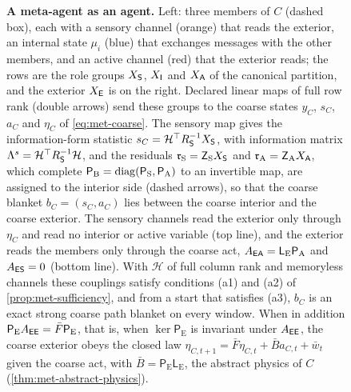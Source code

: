 \begin{figure}[t]
  \centering
  
  \caption{\textbf{A meta-agent as an agent.} Left: three members of $C$ (dashed box), each with a sensory channel (orange) that reads the exterior, an internal state $\mu_i$ (blue) that exchanges messages with the other members, and an active channel (red) that the exterior reads; the rows are the role groups $X_{\mathsf{S}}$, $X_{\mathsf{I}}$ and $X_{\mathsf{A}}$ of the canonical partition, and the exterior $X_{\mathsf{E}}$ is on the right. Declared linear maps of full row rank (double arrows) send these groups to the coarse states $y_C$, $s_C$, $a_C$ and $\eta_C$ of \eqref{eq:met-coarse}. The sensory map gives the information-form statistic $s_C=\mathcal H^\top R_{\mathsf{S}}^{-1}X_{\mathsf{S}}$, with information matrix $\Lambda^s=\mathcal H^\top R_{\mathsf{S}}^{-1}\mathcal H$, and the residuals $\mathfrak r_{\mathrm S}=\mathsf Z_{\mathrm S}X_{\mathsf{S}}$ and $\mathfrak r_{\mathrm A}=\mathsf Z_{\mathrm A}X_{\mathsf{A}}$, which complete $\mathsf P_{\mathrm B}=\operatorname{diag}(\mathsf P_{\mathrm S},\mathsf P_{\mathrm A})$ to an invertible map, are assigned to the interior side (dashed arrows), so that the coarse blanket $b_C=(s_C,a_C)$ lies between the coarse interior and the coarse exterior. The sensory channels read the exterior only through $\eta_C$ and read no interior or active variable (top line), and the exterior reads the members only through the coarse act, $A_{\mathsf{E}\mathsf{A}}=\mathsf L_{\mathrm E}\mathsf P_{\mathrm A}$ and $A_{\mathsf{E}\mathsf{S}}=0$ (bottom line). With $\mathcal H$ of full column rank and memoryless channels these couplings satisfy conditions (a1) and (a2) of \cref{prop:met-sufficiency}, and from a start that satisfies (a3), $b_C$ is an exact strong coarse path blanket on every window. When in addition $\mathsf P_{\mathrm E}A_{\mathsf{E}\mathsf{E}}=\bar F\mathsf P_{\mathrm E}$, that is, when $\ker\mathsf P_{\mathrm E}$ is invariant under $A_{\mathsf{E}\mathsf{E}}$, the coarse exterior obeys the closed law $\eta_{C,t+1}=\bar F\eta_{C,t}+\bar Ba_{C,t}+\bar w_t$ given the coarse act, with $\bar B=\mathsf P_{\mathrm E}\mathsf L_{\mathrm E}$, the abstract physics of $C$ (\cref{thm:met-abstract-physics}).}
  \label{fig:met-partition}
\end{figure}

